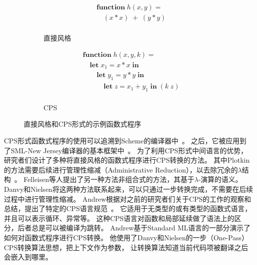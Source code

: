 \begin{figure}
    \centering
    \begin{subfigure}[b]{0.4\textwidth}
        \flushright
     \begin{equation}
        \nonumber
        \begin{aligned}
        &  \mathbf{function}\; h(x,y) = \\
        & \quad (x*x)\; +\; (y*y) \\
        \end{aligned}
    \end{equation}
    \caption{直接风格}
        \label{fig:ori2}
    \end{subfigure}
    \begin{subfigure}[b]{0.5\textwidth}
        \flushleft
        \begin{equation}
            \nonumber
            \begin{aligned}
            & \mathbf{function}\; h(x,y,k)= \\
            & \quad \mathbf{let}\; x_1=x*x\; \mathbf{in} \\
            & \quad\quad \mathbf{let}\; y_1=y*y\; \mathbf{in} \\
            & \quad\quad\quad \mathbf{let}\; z=x_1+y_1\; \mathbf{in}\; (k\; z) \\
            \end{aligned}
        \end{equation}
        \caption{CPS}
        \label{fig:cps2}
    \end{subfigure}
    \caption{直接风格和CPS形式的示例函数式程序}\label{cpsdirect}
  \end{figure}

CPS形式函数式程序的使用可以追溯到Scheme的编译器中~\cite{steele1978rabbit}。
之后，它被应用到了SML-New Jersey编译器的基本框架中~\cite{shao1995type}。
为了利用CPS形式中间语言的优势，研究者们设计了多种将直接风格的函数式程序进行CPS转换的方法。
其中Plotkin的方法需要后续进行管理性缩减（Administrative Reduction），以去除冗余的$\lambda$结构~\cite{plotkin1977lcf}。
Felleisen等人提出了另一种方法非组合式的方法，其基于$\lambda$-演算的语义。
Danvy和Nielsen将这两种方法联系起来，可以只通过一步转换完成，不需要在后续过程中进行管理性缩减\cite{danvy2007one}。
Andrew根据对之前的研究者们关于CPS的工作的观察和总结，提出了特定的CPS语言规范~\cite{kennedy2007compiling}。
它适用于无类型的或有类型的函数式语言，并且可以表示循环、异常等。
这种CPS语言对函数和局部延续做了语法上的区分，后者总是可以被编译为跳转。
Andrew基于Standard ML语言的一部分演示了如何对函数式程序进行CPS转换。
他使用了Danvy和Nielsen的一步（One-Pass）CPS转换算法思想，把上下文作为参数，
让转换算法知道当前代码项被翻译之后会嵌入到哪里。

